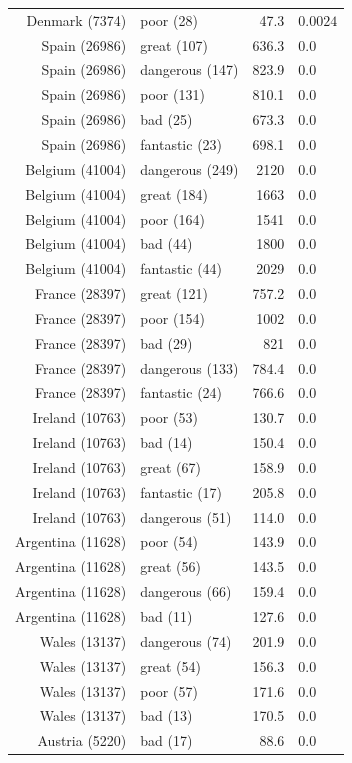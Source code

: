 \documentclass[10pt, a4paper]{UUThesisTemplate}
\begin{document}
\begin{table}
\begin{minipage}[t]{8cm}
\begin{tabular}{r l r l}
Denmark (7374) & poor (28) & 47.3 & $0.0024$\\
Spain (26986) & great (107) & 636.3 & $0.0$\\
Spain (26986) & dangerous (147) & 823.9 & $0.0$\\
Spain (26986) & poor (131) & 810.1 & $0.0$\\
Spain (26986) & bad (25) & 673.3 & $0.0$\\
Spain (26986) & fantastic (23) & 698.1 & $0.0$\\
Belgium (41004) & dangerous (249) & 2120 & $0.0$\\
Belgium (41004) & great (184) & 1663 & $0.0$\\
Belgium (41004) & poor (164) & 1541 & $0.0$\\
Belgium (41004) & bad (44) & 1800 & $0.0$\\
Belgium (41004) & fantastic (44) & 2029 & $0.0$\\
France (28397) & great (121) & 757.2 & $0.0$\\
France (28397) & poor (154) & 1002 & $0.0$\\
France (28397) & bad (29) & 821 & $0.0$\\
France (28397) & dangerous (133) & 784.4 & $0.0$\\
France (28397) & fantastic (24) & 766.6 & $0.0$\\
Ireland (10763) & poor (53) & 130.7 & $0.0$\\
Ireland (10763) & bad (14) & 150.4 & $0.0$\\
Ireland (10763) & great (67) & 158.9 & $0.0$\\
Ireland (10763) & fantastic (17) & 205.8 & $0.0$\\
Ireland (10763) & dangerous (51) & 114.0 & $0.0$\\
Argentina (11628) & poor (54) & 143.9 & $0.0$\\
Argentina (11628) & great (56) & 143.5 & $0.0$\\
Argentina (11628) & dangerous (66) & 159.4 & $0.0$\\
Argentina (11628) & bad (11) & 127.6 & $0.0$\\
Wales (13137) & dangerous (74) & 201.9 & $0.0$\\
Wales (13137) & great (54) & 156.3 & $0.0$\\
Wales (13137) & poor (57) & 171.6 & $0.0$\\
Wales (13137) & bad (13) & 170.5 & $0.0$\\
Austria (5220) & bad (17) & 88.6 & $0.0$\\

\end{tabular}
\end{minipage}
\end{table}
\end{document}
